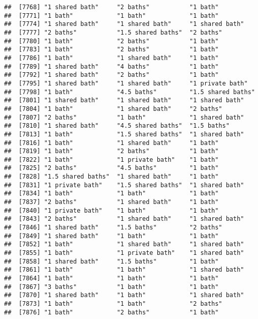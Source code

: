 \documentclass[
]{article}
\begin{document}
\begin{verbatim}
##  [7768] "1 shared bath"     "2 baths"           "1 bath"           
##  [7771] "1 bath"            "1 bath"            "1 bath"           
##  [7774] "1 shared bath"     "1 shared bath"     "1 shared bath"    
##  [7777] "2 baths"           "1.5 shared baths"  "2 baths"          
##  [7780] "1 bath"            "2 baths"           "1 bath"           
##  [7783] "1 bath"            "2 baths"           "1 bath"           
##  [7786] "1 bath"            "1 shared bath"     "1 bath"           
##  [7789] "1 shared bath"     "4 baths"           "1 bath"           
##  [7792] "1 shared bath"     "2 baths"           "1 bath"           
##  [7795] "1 shared bath"     "1 shared bath"     "1 private bath"   
##  [7798] "1 bath"            "4.5 baths"         "1.5 shared baths" 
##  [7801] "1 shared bath"     "1 shared bath"     "1 shared bath"    
##  [7804] "1 bath"            "1 shared bath"     "2 baths"          
##  [7807] "2 baths"           "1 bath"            "1 shared bath"    
##  [7810] "1 shared bath"     "4.5 shared baths"  "1.5 baths"        
##  [7813] "1 bath"            "1.5 shared baths"  "1 shared bath"    
##  [7816] "1 bath"            "1 shared bath"     "1 bath"           
##  [7819] "1 bath"            "2 baths"           "1 bath"           
##  [7822] "1 bath"            "1 private bath"    "1 bath"           
##  [7825] "2 baths"           "4.5 baths"         "1 bath"           
##  [7828] "1.5 shared baths"  "1 shared bath"     "1 bath"           
##  [7831] "1 private bath"    "1.5 shared baths"  "1 shared bath"    
##  [7834] "1 bath"            "1 bath"            "1 bath"           
##  [7837] "2 baths"           "1 shared bath"     "1 bath"           
##  [7840] "1 private bath"    "1 bath"            "1 bath"           
##  [7843] "2 baths"           "1 shared bath"     "1 shared bath"    
##  [7846] "1 shared bath"     "1.5 baths"         "2 baths"          
##  [7849] "1 shared bath"     "1 bath"            "1 bath"           
##  [7852] "1 bath"            "1 shared bath"     "1 shared bath"    
##  [7855] "1 bath"            "1 private bath"    "1 shared bath"    
##  [7858] "1 shared bath"     "1.5 baths"         "1 bath"           
##  [7861] "1 bath"            "1 bath"            "1 shared bath"    
##  [7864] "1 bath"            "1 bath"            "1 bath"           
##  [7867] "3 baths"           "1 bath"            "1 bath"           
##  [7870] "1 shared bath"     "1 bath"            "1 shared bath"    
##  [7873] "1 bath"            "1 bath"            "2 baths"          
##  [7876] "1 bath"            "2 baths"           "1 bath"           

\end{verbatim}
\end{document}
